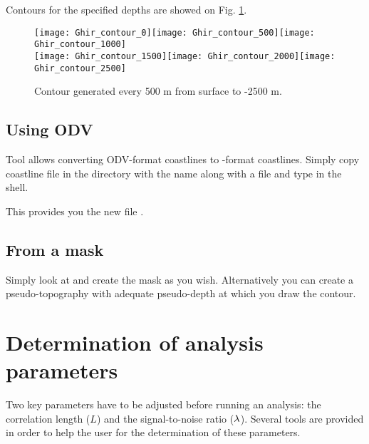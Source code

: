 Contours for the specified depths are showed on Fig. \ref{fig:contourdepth}.


\begin{figure}[htpb]
\centering
\texttt{[image: Ghir\_contour\_0]}\texttt{[image: Ghir\_contour\_500]}\texttt{[image: Ghir\_contour\_1000]}\\
\texttt{[image: Ghir\_contour\_1500]}\texttt{[image: Ghir\_contour\_2000]}\texttt{[image: Ghir\_contour\_2500]}

\caption{Contour generated every 500 m from surface to -2500 m.\label{fig:contourdepth}}
\end{figure}

\subsection{Using ODV}

Tool  allows converting ODV-format coastlines to \diva-format coastlines. Simply copy coastline file in the  directory with the name  along with a  file and type  in the shell. 

This provides you the new file .



\subsection{From a mask}

Simply look at  and create the mask as you wish. Alternatively you can
create a pseudo-topography with adequate pseudo-depth at which you draw the contour.


\section{Determination of analysis parameters}

Two key parameters have to be adjusted before running an analysis: the correlation length ($L$) and the signal-to-noise ratio ($\lambda$). Several tools are provided in order to help the user for the determination of these parameters.


